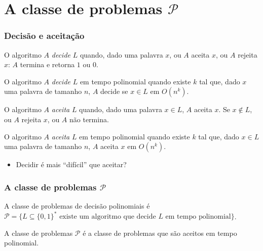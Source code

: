 \documentclass{beamer}
\newcommand{\classP}[0]{\ensuremath{\mathcal{P}}\xspace}
\begin{document}
\section{A classe de problemas \classP}

\begin{frame}
\frametitle{Decisão e aceitação}

\begin{definition}[Decisão]
O algoritmo $A$ \emph{decide} $L$ quando, dado uma palavra $x$, ou $A$ aceita $x$, ou $A$ rejeita $x$: $A$ termina e retorna $1$ ou $0$.
\end{definition}

\begin{definition}
O algoritmo $A$ \emph{decide} $L$ em tempo polinomial quando existe $k$ tal que,
dado $x$ uma palavra de tamanho $n$, $A$ decide se $x \in L$ em $O(n^k)$.
\end{definition}

\begin{definition}[Aceitação]
O algoritmo $A$ \emph{aceita} $L$ quando, dado uma palavra $x \in L$, $A$ aceita
$x$. Se $x \not\in L$, ou $A$ rejeita $x$, ou $A$ não termina.
\end{definition}

\begin{definition}
O algoritmo $A$ \emph{aceita} $L$ em tempo polinomial quando existe $k$ tal que,
dado $x \in L$ uma palavra de tamanho $n$, $A$ aceita $x$ em $O(n^k)$.
\end{definition}

\pause
\begin{itemize}
\item Decidir é mais ``difícil'' que aceitar?
\end{itemize}

\end{frame}


\begin{frame}
\frametitle{A classe de problemas \classP}

\begin{definition}[A classe de problemas \classP]
A classe de problemas de decisão polinomiais é $\classP = \{ L
\subseteq \{0, 1\}^* \mbox{ existe um algoritmo que decide $L$ em
  tempo polinomial} \}$.
\end{definition}

\begin{theorem}
A classe de problemas $\classP$ é a classe de problemas que são aceitos em tempo
polinomial.
\end{theorem}

\end{frame}
\end{document}
